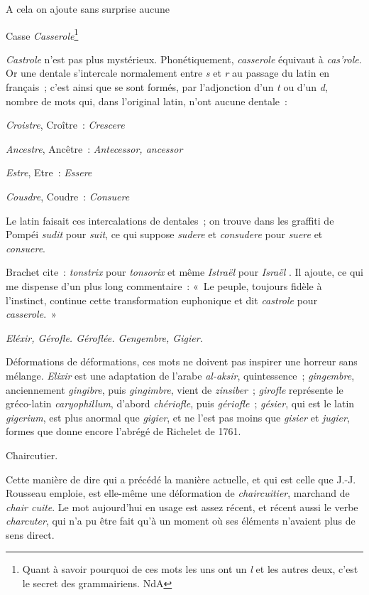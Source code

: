 \documentclass[french,twoside]{book} %
\begin{document}
\noindent A cela on ajoute sans surprise aucune\par
Casse {\itshape Casserole}\footnote{ Quant à savoir pourquoi de ces mots les uns ont un {\itshape l} et les autres deux, c’est le secret des grammairiens. NdA}\par
{\itshape Castrole} n’est pas plus mystérieux. Phonétiquement, {\itshape casserole} équivaut à {\itshape cas’role}. Or une dentale s’intercale normalement entre {\itshape s} et {\itshape r} au passage du latin en français ; c’est ainsi que se sont formés, par l’adjonction d’un {\itshape t} ou d’un {\itshape d}, nombre de mots qui, dans l’original latin, n’ont aucune dentale :\par
{\itshape Croistre}, Croître : {\itshape Crescere}\par
{\itshape Ancestre}, Ancêtre : {\itshape Antecessor, ancessor}\par
{\itshape Estre}, Etre : {\itshape Essere}\par
{\itshape Cousdre}, Coudre : {\itshape Consuere}\par
Le latin faisait ces intercalations de dentales ; on trouve dans les graffiti de Pompéi {\itshape sudit} pour {\itshape suit}, ce qui suppose {\itshape sudere} et {\itshape consudere} pour {\itshape suere} et {\itshape consuere}.\par
Brachet cite : {\itshape tonstrix} pour {\itshape tonsorix} et même {\itshape Istraël} pour {\itshape Israël} . Il ajoute, ce qui me dispense d’un plus long commentaire : « Le peuple, toujours fidèle à l’instinct, continue cette transformation euphonique et dit {\itshape castrole} pour {\itshape casserole}. »\par
{\itshape Eléxir, Gérofle. Géroflée. Gengembre, Gigier.}\par
Déformations de déformations, ces mots ne doivent pas inspirer une horreur sans mélange. {\itshape Elixir} est une adaptation de l’arabe {\itshape al-aksir}, quintessence ; {\itshape gingembre}, anciennement {\itshape gingibre}, puis {\itshape gingimbre}, vient de {\itshape zinsiber} ; {\itshape girofle} représente le gréco-latin {\itshape caryophillum}, d’abord {\itshape chériofle}, puis {\itshape gériofle} ; {\itshape gésier}, qui est le latin {\itshape gigerium}, est plus anormal que {\itshape gigier}, et ne l’est pas moins que {\itshape gisier} et {\itshape jugier}, formes que donne encore l’abrégé de Richelet de 1761.\par
Chaircutier.\par
Cette manière de dire qui a précédé la manière actuelle, et qui est celle que J.-J. Rousseau emploie, est elle-même une déformation de {\itshape chaircuitier}, marchand de {\itshape chair cuite}. Le mot aujourd’hui en usage est assez récent, et récent aussi le verbe {\itshape charcuter}, qui n’a pu être fait qu’à un moment où ses éléments n’avaient plus de sens direct.\par
\end{document}
